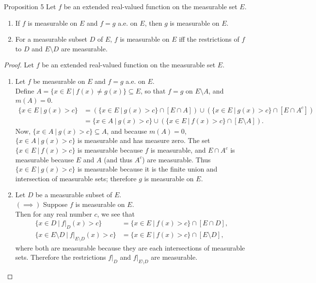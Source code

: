 \begin{flushleft}
\begin{namedthm*}{Proposition 5}
    Let $f$ be an extended real-valued function on the measurable set $E$.
    \begin{enumerate}[label=(\roman*),align=right]
        \item If $f$ is measurable on $E$ and $f=g$ a.e. on $E$, then $g$ is measurable on $E$.
        \item For a measurable subset $D$ of $E$, $f$ is measurable on $E$ iff the restrictions of $f$ to $D$ and $E\setminus D$ are measurable.
    \end{enumerate}
\end{namedthm*}
\begin{proof}
    Let $f$ be an extended real-valued function on the measurable set $E$.
    \begin{enumerate}[label=(\roman*),align=right]
        \item Let $f$ be measurable on $E$ and $f=g$ a.e. on $E$.\\
        Define $A=\{x\in E\ |\ f(x)\neq g(x)\}\subseteq E$, so that $f=g$ on $E\setminus A$, and $m(A)=0$.
        \begin{align*}
            \{x\in E\ |\ g(x)>c\}&=(\{x\in E\ |\ g(x)>c\}\cap[E\cap A])\cup(\{x\in E\ |\ g(x)>c\}\cap[E\cap A^c])\\
            &=\{x\in A\ |\ g(x)>c\}\cup(\{x\in E\ |\ f(x)>c\}\cap[E\setminus A]).
        \end{align*}
        Now, $\{x\in A\ |\ g(x)>c\}\subseteq A$, and because $m(A)=0$, $\{x\in A\ |\ g(x)>c\}$ is measurable and has measure zero.
        The set $\{x\in E\ |\ f(x)>c\}$ is measurable because $f$ is measurable, and $E\cap A^c$ is measurable because $E$ and $A$ (and thus $A^c$) are measurable.
        Thus $\{x\in E\ |\ g(x)>c\}$ is measurable because it is the finite union and intersection of measurable sets; therefore $g$ is measurable on $E$.
        \item Let $D$ be a measurable subset of $E$.\\
        $(\implies)$ Suppose $f$ is measurable on $E$.\\
        Then for any real number $c$, we see that 
        \begin{align*}
            \{x\in D\ |\ f|_{D}(x)>c\}&=\{x\in E\ |\ f(x)>c\}\cap[E\cap D],\\
            \{x\in E\setminus D\ |\ f|_{E\setminus D}(x)>c\}&=\{x\in E\ |\ f(x)>c\}\cap[E\setminus D],
        \end{align*}
        where both are measurable because they are each intersections of measurable sets. Therefore the restrictions $f|_{D}$ and $f|_{E\setminus D}$ are measurable.\\

\end{enumerate}
\end{proof}
\end{flushleft}
